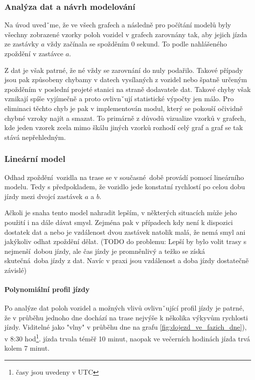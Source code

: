 \subsubsection{Analýza dat a návrh modelování} \label{subsubsection:analyza_dat}

Na úvod uvedˇme, že ve všech grafech a následně pro počítání modelů byly všechny zobrazené vzorky poloh vozidel v grafech zarovnány tak, aby jejich jízda ze zastávky $a$ vždy začínala se spožděním 0 sekund. To podle nahlášeného zpoždění v zastávce $a$.

\bigbreak

Z dat je však patrné, že né vždy se zarovnání do nuly podařilo. Takové případy jsou pak způsobeny chybamy v datech vysílaných z vozidel nebo špatně určeným zpožděním v poslední projeté stanici na straně dodavatele dat. Takové chyby však vznikají spíše vyjímečně a proto ovlivnˇují statistické výpočty jen málo. Pro eliminaci těchto chyb je pak v implementován modul, který se pokouší očividně chybné vzroky najít a smazat. To primárně z důvodů vizualize vzorků v grafech, kde jeden vzorek zcela mimo škálu jiných vzorků rozhodí celý graf a graf se tak stává nepřehledným.

\subsubsection{Lineární model}


Odhad zpoždění vozidla na trase se v současné době provádí pomocí lineárního modelu. Tedy s předpokladem, že vozidlo jede konstatní rychlostí po celou dobu jízdy mezi dvojcí zastávek $a$ a $b$.

\bigbreak

Ačkoli je snaha tento model nahradit lepším, v některých situacích může jeho použití i na dále dávat smysl. Zejména pak v případech kdy není k dispozici dostatek dat a nebo je vzdálenost dvou zastávek natolik malá, že nemá smyl ani jakýkoliv odhat zpoždění dělat. (TODO do problemu: Lepší by bylo volit trasy s nejmenší dobou jízdy, ale čas jízdy je promněnlivý a težko se získá skutečná doba jízdy z dat. Navíc v praxi jsou vzdálenost a doba jízdy dostatečně závislé)

\paragraph{Polynomiální profil jízdy}

Po analýze dat poloh vozidel a možných vlivů ovlivnˇující profil jízdy je patrné, že v průběhu jednoho dne dochází na trase nejvýše k několika výkyvům rychlosti jízdy. Viditelné jako "vlny" v průběhu dne na grafu \ref{fig:dojezd_ve_fazich_dne}), v 8:30 hod\footnote{časy jsou uvedeny v UTC}. jízda trvala téměř 10 minut, naopak ve večerních hodinách jízda trvá kolem 7 minut.

